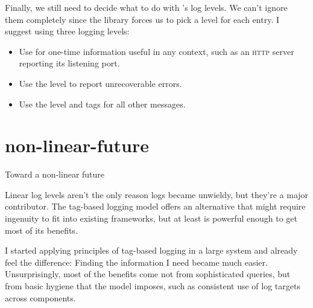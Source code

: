 \documentclass{article}
\begin{document}
Finally, we still need to decide what to do with 's log levels.
We can't ignore them completely since the library forces us to pick a level for each entry.
I suggest using three logging levels:

\begin{itemize}
\item Use  for one-time information useful in any context,
  such as an \textsc{http} server reporting its listening port.
\item Use the  level to report unrecoverable errors.
\item Use the  level and tags for all other messages.
\end{itemize}

\section{non-linear-future}{Toward a non-linear future}

Linear log levels aren't the only reason logs became unwieldy, but they're a major contributor.
The tag-based logging model offers an alternative that might require ingenuity to fit into existing frameworks,
but at least  is powerful enough to get most of its benefits.

I started applying principles of tag-based logging in a large system and already feel the difference:
Finding the information I need became much easier.
Unsurprisingly, most of the benefits come not from sophisticated queries,
but from basic hygiene that the model imposes,
such as consistent use of log targets across components.
\end{document}
